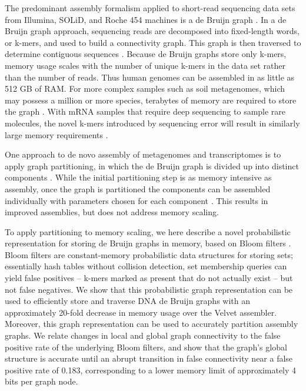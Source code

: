 \documentclass[12pt]{article} \usepackage{simplemargins}
\begin{document}
The predominant assembly formalism applied to short-read sequencing
data sets from Illumina, SOLiD, and Roche 454 machines is a de Bruijn
graph \cite{pubmed20211242,pubmed22068540}.  In a de Bruijn graph approach, sequencing reads are decomposed
into fixed-length words, or k-mers, and used to build a connectivity
graph.  This graph is then traversed to determine contiguous sequences
\cite{pubmed22068540}.  Because de Bruijn graphs store only
k-mers, memory usage scales with the number of unique k-mers in the
data set rather than the number of reads.  Thus human genomes can be
assembled in as little as 512 GB of RAM\cite{pmid21187386}.  For
more complex samples such as soil metagenomes, which may possess a
million or more species, terabytes of memory are required to store the
graph \cite{pubmed21304727}.  With mRNA samples that require deep sequencing to sample rare
molecules, the novel k-mers introduced by sequencing error will result in
similarly large memory requirements \cite{trinity}.

One approach to de novo assembly of metagenomes and transcriptomes is
to apply graph partitioning, in which the de Bruijn graph is divided
up into distinct components \cite{trinity, metavelvet,pubmed21685107}.
While the initial partitioning step is as memory
intensive as assembly, once the graph is partitioned the components
can be assembled individually with parameters chosen for each
component \cite{metavelvet,pubmed21685107}.  This results in improved assemblies, but does not
address memory scaling.

To apply partitioning to memory scaling, we here describe a novel
probabilistic representation for storing de Bruijn graphs in memory,
based on Bloom filters \cite{bloom}.  Bloom filters are constant-memory
probabilistic data structures for storing sets; essentially hash
tables without collision detection, set membership queries can yield
false positives -- k-mers marked as present that do not actually exist --
but not false negatives.  We show that this
probabilistic graph representation can be used to efficiently store
and traverse DNA de Bruijn graphs with an approximately 20-fold
decrease in memory usage over the Velvet assembler. Moreover, this
graph representation can be used to accurately partition assembly
graphs.  We relate changes in local and global graph connectivity
to the false positive rate of the underlying Bloom filters, and
show that the graph's global structure is accurate until an abrupt
transition in false connectivity near a false positive rate of 0.183,
corresponding to a lower memory limit of approximately 4 bits per graph node.
\end{document}
